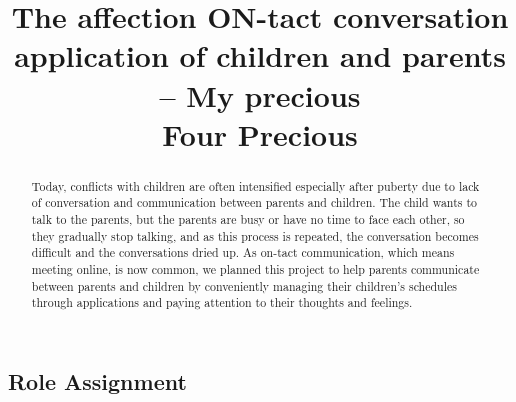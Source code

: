 \documentclass[conference]{IEEEtran}
\begin{document}
\title{The affection ON-tact conversation application of children and parents – My precious\\
{\footnotesize Four Precious}
}

\author{
\and
{}
\and
{}
\and
{}
}

\maketitle

\begin{abstract}
  Today, conflicts with children are often intensified especially after puberty due to lack of conversation and communication between parents and children. The child wants to talk to the parents, but the parents are busy or have no time to face each other, so they gradually stop talking, and as this process is repeated, the conversation becomes difficult and the conversations dried up. As on-tact communication, which means meeting online, is now common, we planned this project to help parents communicate between parents and children by conveniently managing their children's schedules through applications and paying attention to their thoughts and feelings.
\end{abstract}

\subsection{Role Assignment}
\end{document}
